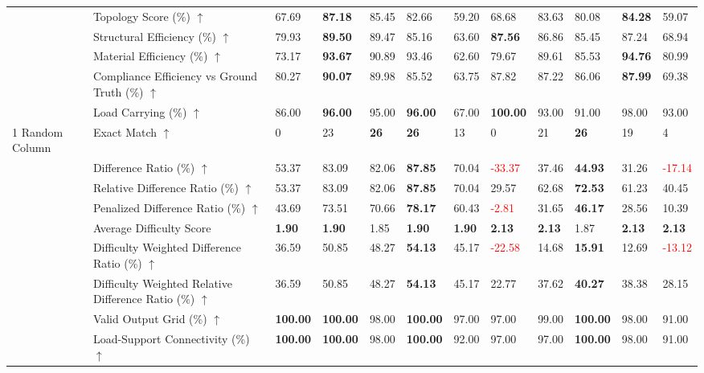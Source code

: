 \begin{table}[!h]
{\begin{tabular}{lllllll|lllll}
 & Topology Score (\%) $\uparrow$ & 67.69 & \textbf{87.18} & 85.45 & 82.66 & 59.20 & 68.68 & 83.63 & 80.08 & \textbf{84.28} & 59.07 \\
 & Structural Efficiency (\%) $\uparrow$ & 79.93 & \textbf{89.50} & 89.47 & 85.16 & 63.60 & \textbf{87.56} & 86.86 & 85.45 & 87.24 & 68.94 \\
 & Material Efficiency (\%) $\uparrow$ & 73.17 & \textbf{93.67} & 90.89 & 93.46 & 62.60 & 79.67 & 89.61 & 85.53 & \textbf{94.76} & 80.99 \\
 & Compliance Efficiency vs Ground Truth (\%) $\uparrow$ & 80.27 & \textbf{90.07} & 89.98 & 85.52 & 63.75 & 87.82 & 87.22 & 86.06 & \textbf{87.99} & 69.38 \\
 & Load Carrying (\%) $\uparrow$ & 86.00 & \textbf{96.00} & 95.00 & \textbf{96.00} & 67.00 & \textbf{100.00} & 93.00 & 91.00 & 98.00 & 93.00 \\
\midrule
1 Random Column & Exact Match $\uparrow$ & 0 & 23 & \textbf{26} & \textbf{26} & 13 & 0 & 21 & \textbf{26} & 19 & 4 \\
 & Difference Ratio (\%) $\uparrow$ & 53.37 & 83.09 & 82.06 & \textbf{87.85} & 70.04 & \textcolor{red}{-33.37} & 37.46 & \textbf{44.93} & 31.26 & \textcolor{red}{-17.14} \\
 & Relative Difference Ratio (\%) $\uparrow$ & 53.37 & 83.09 & 82.06 & \textbf{87.85} & 70.04 & 29.57 & 62.68 & \textbf{72.53} & 61.23 & 40.45 \\
 & Penalized Difference Ratio (\%) $\uparrow$ & 43.69 & 73.51 & 70.66 & \textbf{78.17} & 60.43 & \textcolor{red}{-2.81} & 31.65 & \textbf{46.17} & 28.56 & 10.39 \\
 & Average Difficulty Score & \textbf{1.90} & \textbf{1.90} & 1.85 & \textbf{1.90} & \textbf{1.90} & \textbf{2.13} & \textbf{2.13} & 1.87 & \textbf{2.13} & \textbf{2.13} \\
 & Difficulty Weighted Difference Ratio (\%) $\uparrow$ & 36.59 & 50.85 & 48.27 & \textbf{54.13} & 45.17 & \textcolor{red}{-22.58} & 14.68 & \textbf{15.91} & 12.69 & \textcolor{red}{-13.12} \\
 & Difficulty Weighted Relative Difference Ratio (\%) $\uparrow$ & 36.59 & 50.85 & 48.27 & \textbf{54.13} & 45.17 & 22.77 & 37.62 & \textbf{40.27} & 38.38 & 28.15 \\
 & Valid Output Grid (\%) $\uparrow$ & \textbf{100.00} & \textbf{100.00} & 98.00 & \textbf{100.00} & 97.00 & 97.00 & 99.00 & \textbf{100.00} & 98.00 & 91.00 \\
 & Load-Support Connectivity (\%) $\uparrow$ & \textbf{100.00} & \textbf{100.00} & 98.00 & \textbf{100.00} & 92.00 & 97.00 & 97.00 & \textbf{100.00} & 98.00 & 91.00 \\

\end{tabular}}
\end{table}
